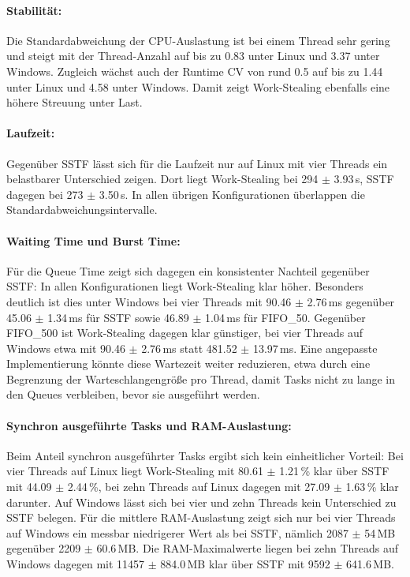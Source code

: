 \begin{sloppypar}
\paragraph{Stabilität:}
Die Standardabweichung der \acs{CPU}-Auslastung ist bei einem Thread sehr gering und steigt mit der Thread-Anzahl auf bis zu 0.83 unter Linux und 3.37 unter Windows. Zugleich wächst auch der Runtime \acs{CV} von rund 0.5 auf bis zu 1.44 unter Linux und 4.58 unter Windows. Damit zeigt Work-Stealing ebenfalls eine höhere Streuung unter Last.

\paragraph{Laufzeit:}
Gegenüber \acs{SSTF} lässt sich für die Laufzeit nur auf Linux mit vier Threads ein belastbarer Unterschied zeigen. Dort liegt Work-Stealing bei 294 $\pm$ 3.93\,s, \acs{SSTF} dagegen bei 273 $\pm$ 3.50\,s. In allen übrigen Konfigurationen überlappen die Standardabweichungsintervalle.

\paragraph{Waiting Time und Burst Time:}
Für die Queue Time zeigt sich dagegen ein konsistenter Nachteil gegenüber \acs{SSTF}: In allen Konfigurationen liegt Work-Stealing klar höher. Besonders deutlich ist dies unter Windows bei vier Threads mit 90.46 $\pm$ 2.76\,ms gegenüber 45.06 $\pm$ 1.34\,ms für \acs{SSTF} sowie 46.89 $\pm$ 1.04\,ms für \acs{FIFO}\_50. Gegenüber \acs{FIFO}\_500 ist Work-Stealing dagegen klar günstiger, bei vier Threads auf Windows etwa mit 90.46 $\pm$ 2.76\,ms statt 481.52 $\pm$ 13.97\,ms. Eine angepasste Implementierung könnte diese Wartezeit weiter reduzieren, etwa durch eine Begrenzung der Warteschlangengröße pro Thread, damit Tasks nicht zu lange in den Queues verbleiben, bevor sie ausgeführt werden.

\paragraph{Synchron ausgeführte Tasks und \acs{RAM}-Auslastung:}
Beim Anteil synchron ausgeführter Tasks ergibt sich kein einheitlicher Vorteil: Bei vier Threads auf Linux liegt Work-Stealing mit 80.61 $\pm$ 1.21\,\% klar über \acs{SSTF} mit 44.09 $\pm$ 2.44\,\%, bei zehn Threads auf Linux dagegen mit 27.09 $\pm$ 1.63\,\% klar darunter. Auf Windows lässt sich bei vier und zehn Threads kein Unterschied zu \acs{SSTF} belegen. Für die mittlere \acs{RAM}-Auslastung zeigt sich nur bei vier Threads auf Windows ein messbar niedrigerer Wert als bei \acs{SSTF}, n\"amlich 2087 $\pm$ 54\,MB gegenüber 2209 $\pm$ 60.6\,MB. Die \acs{RAM}-Maximalwerte liegen bei zehn Threads auf Windows dagegen mit 11457 $\pm$ 884.0\,MB klar über \acs{SSTF} mit 9592 $\pm$ 641.6\,MB.


\end{sloppypar}
